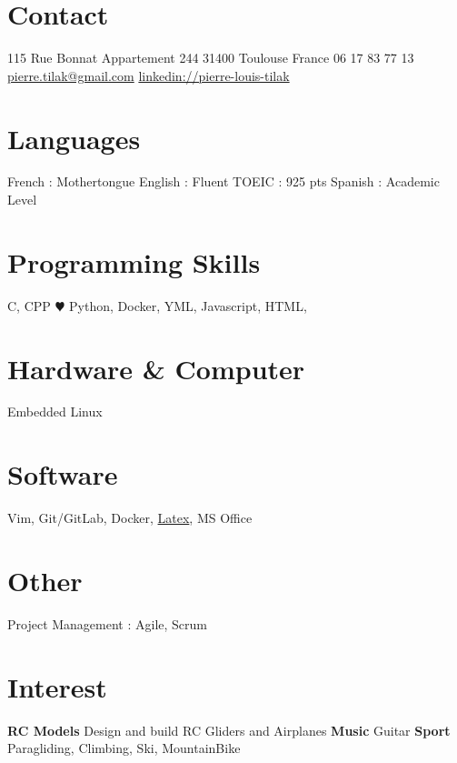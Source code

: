 \documentclass[a4paper]{friggeri-cv} %
\begin{document}


\begin{aside} %
\section{Contact}
115 Rue Bonnat
Appartement 244
31400 Toulouse
France
06 17 83 77 13
~
\href{mailto:pierre.tilak@gmail.com}{pierre.tilak@gmail.com}
\href{https://www.linkedin.com/pub/pierre-louis-tilak/96/162/a83}{linkedin://pierre-louis-tilak}
\section{Languages}
French : Mothertongue
English : Fluent
TOEIC : 925 pts 
Spanish : Academic Level\bigskip\bigskip
\section{Programming Skills}
C, CPP
{\color{red} $\varheartsuit$} Python, 
Docker, YML,
Javascript,
HTML,\bigskip\bigskip
\section{Hardware \& Computer}
Embedded Linux\bigskip\bigskip
\section{Software}
Vim, Git/GitLab, Docker, \href{https://github.com/tilaktilak/CV}{Latex}, MS Office\bigskip\bigskip
\section{Other}
Project Management : Agile, Scrum	\bigskip\bigskip
\section{Interest}
\textbf{RC Models} Design and build RC Gliders and Airplanes
\textbf{Music} Guitar
\textbf{Sport} Paragliding, Climbing, Ski, MountainBike
\end{aside}
\end{document}
